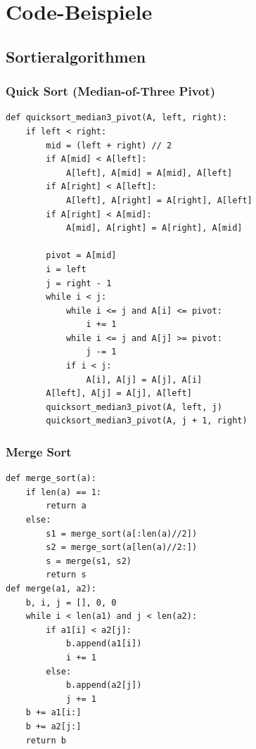 \section{Code-Beispiele}\label{sec:12-code-beispiele}

\subsection{Sortieralgorithmen}\label{sec:12-sortieralgorithmen}


\subsubsection{Quick Sort (Median-of-Three Pivot)}
\begin{codebox}
\begin{lstlisting}[style=CodeExpert]
def quicksort_median3_pivot(A, left, right):
    if left < right:
        mid = (left + right) // 2
        if A[mid] < A[left]:
            A[left], A[mid] = A[mid], A[left]
        if A[right] < A[left]:
            A[left], A[right] = A[right], A[left]
        if A[right] < A[mid]:
            A[mid], A[right] = A[right], A[mid]

        pivot = A[mid]
        i = left
        j = right - 1
        while i < j:
            while i <= j and A[i] <= pivot:
                i += 1
            while i <= j and A[j] >= pivot:
                j -= 1
            if i < j:
                A[i], A[j] = A[j], A[i]
        A[left], A[j] = A[j], A[left]
        quicksort_median3_pivot(A, left, j)
        quicksort_median3_pivot(A, j + 1, right)
\end{lstlisting}
\end{codebox}

\subsubsection{Merge Sort}
\begin{codebox}
\begin{lstlisting}[style=CodeExpert]
def merge_sort(a):
    if len(a) == 1:
        return a
    else:
        s1 = merge_sort(a[:len(a)//2])
        s2 = merge_sort(a[len(a)//2:])
        s = merge(s1, s2)
        return s
def merge(a1, a2):
    b, i, j = [], 0, 0
    while i < len(a1) and j < len(a2):
        if a1[i] < a2[j]:
            b.append(a1[i])
            i += 1
        else:
            b.append(a2[j])
            j += 1
    b += a1[i:]
    b += a2[j:]
    return b
\end{lstlisting}
\end{codebox}


